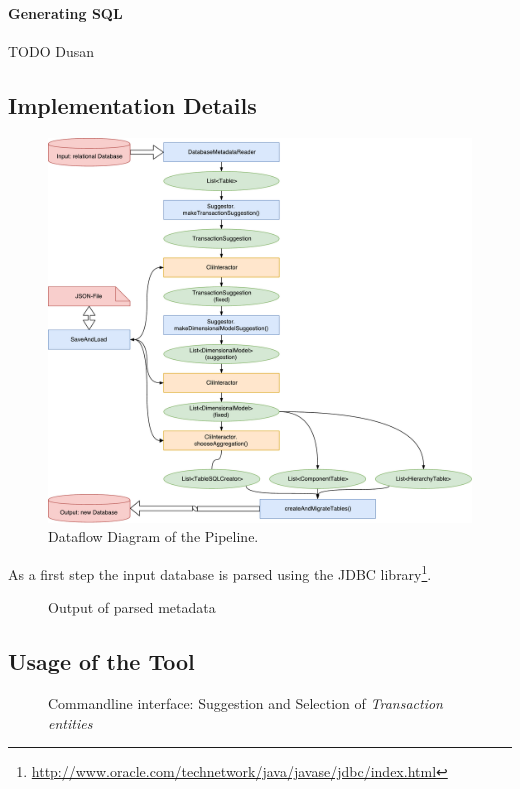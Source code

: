 \paragraph{Generating SQL}
TODO Dusan %

\subsection{Implementation Details}

\begin{figure}
  \centering
  \includegraphics[width=\linewidth]{images/dataFlowDiagram}
  \caption{Dataflow Diagram of the Pipeline.}
  \label{fig:dataflowDiagram}
\end{figure}

As a first step the input database is parsed using the JDBC library\footnote{\url{http://www.oracle.com/technetwork/java/javase/jdbc/index.html}}.

\begin{figure}[p]
  
  \caption{Output of parsed metadata}
  \label{fig:metadataOutput}
\end{figure}

\subsection{Usage of the Tool}

\begin{figure}[p]
  
  \caption{Commandline interface: Suggestion and Selection of \emph{Transaction entities}}
  \label{fig:transactoinSuggestion}
\end{figure}

